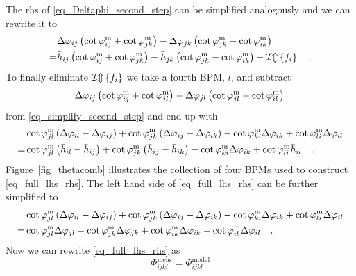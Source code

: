 The rhs of \eqref{eq_Deltaphi_second_step} can be simplified analogously and we can rewrite it to
\begin{align}
  & \Delta\varphi_{ij} \left( 
    \cot \varphi_{ij}^\text{m} + \cot\varphi_{jk}^\text{m}
  \right)
  -
  \Delta\varphi_{jk} \left( 
    \cot\varphi_{jk}^\text{m} - \cot\varphi_{ik}^\text{m}
  \right) \notag \\
  =& 
  \bar{h}_{ij} \left( 
    \cot \varphi_{ij}^\text{m} + \cot\varphi_{jk}^\text{m}
  \right)
  -
  \bar{h}_{jk} \left( 
    \cot\varphi_{jk}^\text{m} - \cot\varphi_{ik}^\text{m}
  \right)
  - \mathcal{Im} \left\{ f_i \right\}
  \quad .
  \label{eq_simplify_second_step}
\end{align}
To finally eliminate $\mathcal{Im} \left\{ f_i \right\}$ we take a fourth BPM, $l$, and subtract 
\begin{equation}
   \Delta\varphi_{ij} \left( 
    \cot \varphi_{ij}^\text{m} + \cot\varphi_{jl}^\text{m}
  \right)
  -
  \Delta\varphi_{jl} \left( 
    \cot\varphi_{jl}^\text{m} - \cot\varphi_{il}^\text{m}
  \right) \notag \\
  \label{eq_fourth_bpm}
\end{equation}
from \eqref{eq_simplify_second_step} and end up with
\begin{align}
 &\cot\varphi_{jl}^\text{m} \left( \Delta\varphi_{il} - \Delta\varphi_{ij} \right) 
 + \cot\varphi_{jk}^\text{m} \left( \Delta\varphi_{ij} - \Delta\varphi_{ik} \right) 
 - \cot\varphi_{ki}^\text{m} \Delta \varphi_{ik} + \cot\varphi_{li}^\text{m}\Delta\varphi_{il}\notag  \\
 =& 
 \cot\varphi_{jl}^\text{m} \left( \bar{h}_{il} - \bar{h}_{ij} \right) 
 + \cot\varphi_{jk}^\text{m} \left( \bar{h}_{ij} - \bar{h}_{ik} \right)
 - \cot\varphi_{ki}^\text{m} \Delta \varphi_{ik} + \cot\varphi_{li}^\text{m}\bar{h}_{il} 
\quad .
\label{eq_full_lhs_rhs}
\end{align}
Figure~\ref{fig_thetacomb} illustrates the collection of four BPMs used to construct
\eqref{eq_full_lhs_rhs}.
The left hand side of \eqref{eq_full_lhs_rhs} can be further simplified to
  \begin{align}
 &\cot\varphi_{jl}^\text{m} \left( \Delta\varphi_{il} - \Delta\varphi_{ij} \right) 
 + \cot\varphi_{jk}^\text{m} \left( \Delta\varphi_{ij} - \Delta\varphi_{ik} \right) 
 - \cot\varphi_{ki}^\text{m} \Delta \varphi_{ik} + \cot\varphi_{li}^\text{m}\Delta\varphi_{il} \notag\\
 =&\cot\varphi_{jl}^\text{m} \Delta\varphi_{jl} - \cot\varphi_{jk}^\text{m} \Delta\varphi_{jk}
+ \cot\varphi_{ik}^\text{m}\Delta\varphi_{ik} - \cot\varphi_{il}^\text{m}\Delta\varphi_{il}
\quad .
  \end{align}
  Now we can rewrite \eqref{eq_full_lhs_rhs} as
\begin{equation}
  \Phi_{ijkl}^{\mathrm{meas}} = \Phi_{ijkl}^{\mathrm{model}} 
  \label{eq_Deltaphi_model_meas_app}
\end{equation}
